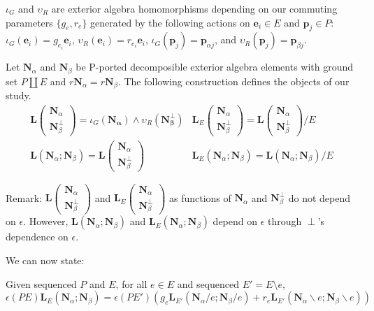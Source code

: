 \documentclass[Unicode]{cedram-alco}
\newcommand{\ext}[1]{\ensuremath{\mathbf{#1}}}
\newcommand{\eNal}{\ensuremath{\ext{N}_{\alpha}}}
\newcommand{\eNbePe}{\ensuremath{\ext{N}_{\beta}^{\perp}}}
\newcommand{\eNbe}{\ensuremath{\ext{N}_\beta}}
\newcommand{\Is}{\ensuremath{\iota}}
\newcommand{\Vs}{\ensuremath{\upsilon}}
\newcommand{\dunion}{\coprod}
\newcommand{\extLVert}[2]{\ext{L}\left( \begin{array}{c} {#1}\\ {#2} \end{array} \right)}
\newcommand{\extLHorSub}[3]{\ext{L}_{#1}\left(  {#2}; {#3}  \right)}
\newcommand{\LVert}[2]{\ext{L}\left( \begin{array}{c} {#1}\\ {#2} \end{array} \right)}
\newcommand{\LVertSub}[3]{\ext{L}_{#1}\left( \begin{array}{c} {#2}\\ {#3} \end{array} \right)}
\newcommand{\LHor}[2]{\ext{L}\left( {#1}; {#2} \right)}
\newcommand{\LHorSub}[3]{\ext{L}_{#1}\left(  {#2}; {#3}  \right)}
\begin{document}
\begin{defi}\label{iGvRdefs}
  $\Is_G$ and $\Vs_R$ are exterior algebra homomorphisms depending on our commuting parameters
  $\{g_e, r_e\}$ generated by
  the following actions on $\ext{e}_i\in E$ and $\ext{p}_j\in P$:
  $\Is_G(\ext{e}_i)= g_{e_i}\ext{e}_i$, $\Vs_R(\ext{e}_i)=r_{e_i}\ext{e}_i$,
  $\Is_G(\ext{p}_j)=\ext{p}_{\alpha j}$, and   $\Vs_R(\ext{p}_j)=\ext{p}_{\beta j}$.
\end{defi}

\begin{defi}\label{LDefs}
  Let $\ext{N}_\alpha$ and $\ext{N}_\beta$ be P-ported decomposible exterior algebra elements
  with ground set $P\dunion E$ and $r\ext{N}_\alpha=r\ext{N}_\beta$.
  The following construction defines the objects of our study.
  \begin{equation}
  \begin{array}{cc}
    \LVert{\eNal}{\eNbePe} = \Is_G(\ext{N_\alpha})\wedge\Vs_R(\ext{N_{\beta}^\perp}) &
    \LVertSub{E}{\eNal}{\eNbePe} = \LVert{\eNal}{\eNbePe}/E\\
    \LHor{\eNal}{\eNbe}=\extLVert{\eNal}{\eNbePe} &
    \LHorSub{E}{\eNal}{\eNbe}=\LHor{\eNal}{\eNbe}/E
  \end{array}
  \end{equation}
\end{defi}


Remark: $\LVert{\eNal}{\eNbePe}$ and $\LVertSub{E}{\eNal}{\eNbePe}$ as functions of
$\eNal$ and $\eNbePe$ do not depend on $\epsilon$.  However, $\LHor{\eNal}{\eNbe}$
and $\LHorSub{E}{\eNal}{\eNbe}$ depend on $\epsilon$ through $\perp$'s dependence
on $\epsilon$.  




We can now state:



\begin{theo*}
  Given sequenced $P$ and $E$, for all $e\in E$ and sequenced $E'=E\setminus e$,
  \begin{equation}\label{delecontrequation-intro}
     \epsilon(PE)\extLHorSub{E}{\eNal}{\eNbe}=
      \epsilon(PE')
      \left(
      g_e\extLHorSub{E'}{\eNal/e}{\eNbe/e} +
      r_e\extLHorSub{E'}{\eNal\backslash e}{\eNbe\backslash e}\right)
  \end{equation}
\end{theo*}
\end{document}

